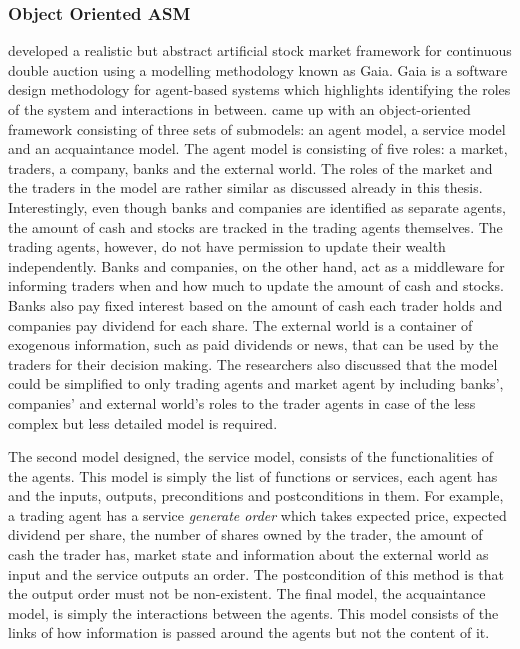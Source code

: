 \subsubsection{Object Oriented ASM}
\citet{Ben12} developed a realistic but abstract artificial stock market 
framework for continuous double auction using a modelling methodology known as 
Gaia. Gaia is a software design methodology for agent-based systems which 
highlights identifying the roles of the system and interactions in between. 
\citet{Ben12} came up with an object-oriented framework consisting of three sets of submodels: 
an agent model, a service model and an acquaintance model. The agent model is consisting of 
five roles: a market, traders, a company, banks and the external world. 
The roles of the market and the traders in the model are rather similar 
as discussed already in this thesis. Interestingly, even though banks and 
companies are identified as separate agents, the amount of cash and stocks 
are tracked in the trading agents themselves. The trading agents, however, do not have permission 
to update their wealth independently. Banks and companies, on the other hand, act 
as a middleware for informing traders when and how much to update the amount of cash 
and stocks. Banks also pay fixed interest based on the amount of cash each trader 
holds and companies pay dividend for each share. The external world is a container of 
exogenous information, such as paid dividends or news, that can be used by the 
traders for their decision making. The researchers also discussed that the model 
could be simplified to only trading agents and market agent by including banks', 
companies' and external world's roles to the trader agents in case of the less complex but 
less detailed model is required.

The second model \citet{Ben12} designed, the service model, 
consists of the functionalities of the agents. This model is simply the list of 
functions or services, each agent has and the inputs, outputs, preconditions and postconditions 
in them. For example, a trading agent has a service \textit{generate order} which takes 
expected price, expected dividend per share, the number of shares owned by the trader, 
the amount of cash the trader has, market state and information about the external world as input 
and the service outputs an order. The postcondition of this method is that the output order 
must not be non-existent. The final model, the acquaintance model, is simply the interactions 
between the agents. This model consists of the links of how information is passed around the 
agents but not the content of it.

